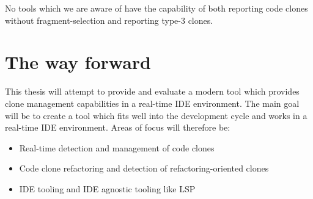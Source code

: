 \documentclass[12pt]{article}
\begin{document}
No tools which we are aware of have the capability of both reporting code clones without
fragment-selection and reporting type-3 clones.

\section{The way forward}

This thesis will attempt to provide and evaluate a modern tool which provides clone management
capabilities in a real-time IDE environment. The main goal will be to create a tool which
fits well into the development cycle and works in a real-time IDE environment. Areas of
focus will therefore be:

\begin{itemize}
    \item Real-time detection and management of code clones
    \item Code clone refactoring and detection of refactoring-oriented clones
    \item IDE tooling and IDE agnostic tooling like LSP\cite{}
\end{itemize}



\end{document}
